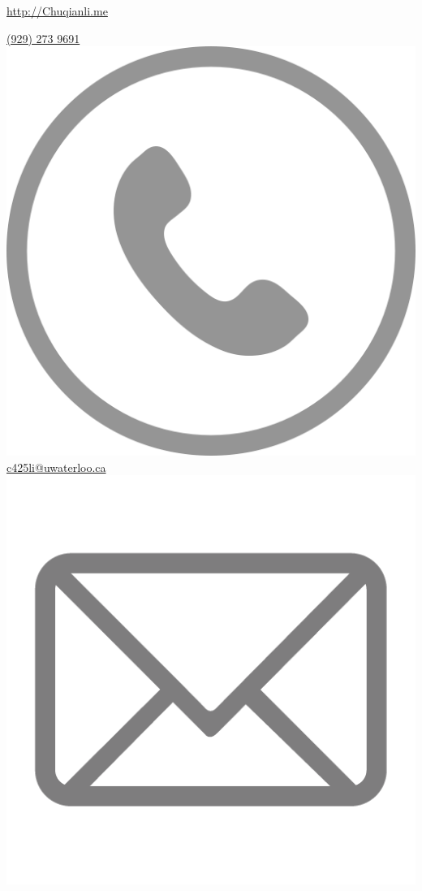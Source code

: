\documentclass[]{friggeri-cv}
\begin{document}
       {\href{http://chuqianli.me}{http://Chuqianli.me}}


\begin{aside}
  \href{tel:19292739691}{(929) 273 9691 \includegraphics[scale=0.02]{phone-512.png}}
  \href{mailto:c425li@edu.uwaterloo.ca}{c425li@uwaterloo.ca\includegraphics[scale=0.04]{email-icon.png}}

\end{aside}
\end{document}

